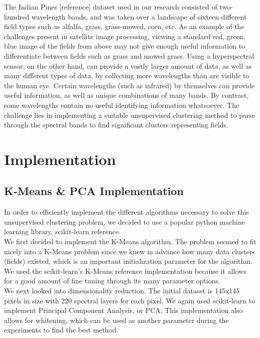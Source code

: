 \documentclass[journal]{IEEEtran}
\begin{document}
The Indian Pines [reference] dataset used in our research consisted of two-hundred wavelength bands, and was taken over a landscape of sixteen different field types such as alfalfa, grass, grass-mowed, corn, etc.  As an example of the challenges present in satellite image processing, viewing a standard red, green, blue image of the fields from above may not give enough useful information to differentiate between fields such as grass and mowed grass.  Using a hyperspectral sensor, on the other hand, can provide a vastly larger amount of data, as well as many different types of data, by collecting more wavelengths than are visible to the human eye. Certain wavelengths (such as infrared) by themselves can provide useful information, as well as unique combinations of many bands.  By contrast, some wavelengths contain no useful identifying information whatsoever.  The challenge lies in implementing a suitable unsupervised clustering method to parse through the spectral bands to find significant clusters representing fields.\\



\section{Implementation}
  \subsection{K-Means \& PCA Implementation}
    In order to efficiently implement the different algorithms necessary to solve this unsupervised clustering problem, we decided to use a popular python machine learning library, scikit-learn reference.\\

    We first decided to implement the K-Means algorithm. The problem seemed to fit nicely into a K-Means problem since we knew in advance how many data clusters (fields) existed, which is an important initialization parameter for the algorithm. We used the scikit-learn's K-Means reference  implementation because it allows for a good amount of fine tuning through its many parameter options.\\

    We next looked into dimensionality reduction. The initial dataset is 145x145 pixels in size with 220 spectral layers for each pixel. We again used scikit-learn to implement Principal Component Analysis, or PCA. This implementation also allows for whitening, which can be used as another parameter during the experiments to find the best method.\\
\end{document}
